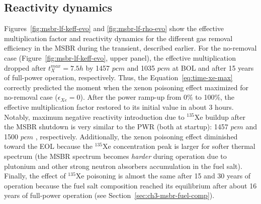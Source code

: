 \subsection{Reactivity dynamics}
Figures~\ref{fig:msbr-lf-keff-evo} and \ref{fig:msbr-lf-rho-evo} show the 
effective multiplication factor and reactivity dynamics for the 
different gas removal efficiency in the \gls{MSBR} during the transient, 
described earlier. For the no-removal case (Figure~\ref{fig:msbr-lf-keff-evo}, 
upper panel), the effective multiplication dropped after $t^{max}_X=7.5h$ by 
1457 $pcm$ and 1035 $pcm$ at \gls{BOL} and after 15 years of full-power 
operation, respectively. Thus, the Equation~\ref{eq:time-xe-max} correctly 
predicted the moment when the xenon poisoning effect maximized for no-removal 
case ($\epsilon_{Xe}=0$).
After the power ramp-up from 0\% to 100\%, the effective multiplication factor 
restored to its initial value in about 3 hours. Notably, maximum 
negative reactivity introduction due to $^{135}$Xe buildup after the 
\gls{MSBR} shutdown is very similar to the \gls{PWR} (both at startup): 1457 
$pcm$ and 1500 $pcm$ \cite{rykhlevskii_impact_2019}, respectively. 
Additionally, the xenon poisoning effect diminished toward the \gls{EOL} 
because the $^{135}$Xe concentration peak is larger for softer thermal 
spectrum (the \gls{MSBR} spectrum becomes \emph{harder} during  operation due 
to plutonium and other strong neutron absorbers accumulation in the fuel salt).
Finally, the effect of $^{135}$Xe poisoning is almost the same after 15 and 30 
years of operation because the fuel salt composition reached its equilibrium 
after about 16 years of full-power operation (see 
Section~\ref{sec:ch3-msbr-fuel-comp}).

